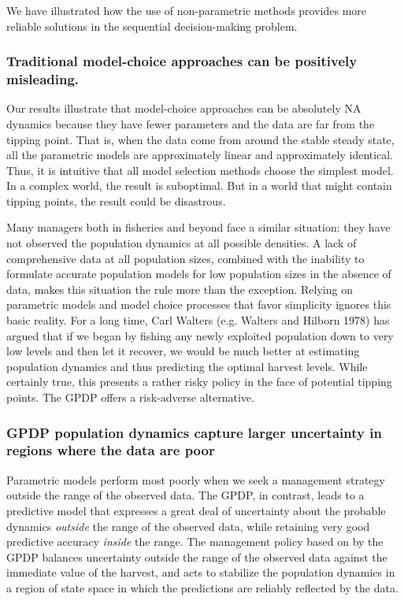 \documentclass[author-year, 12pt,review]{components/elsarticle} %
\begin{document}
We have illustrated how the use of non-parametric methods provides more
reliable solutions in the sequential decision-making problem.

\subsubsection{Traditional model-choice approaches can be positively
misleading.}\label{traditional-model-choice-approaches-can-be-positively-misleading.}

Our results illustrate that model-choice approaches can be absolutely NA
dynamics because they have fewer parameters and the data are far from
the tipping point. That is, when the data come from around the stable
steady state, all the parametric models are approximately linear and
approximately identical. Thus, it is intuitive that all model selection
methods choose the simplest model. In a complex world, the result is
suboptimal. But in a world that might contain tipping points, the result
could be disastrous.

Many managers both in fisheries and beyond face a similar situation:
they have not observed the population dynamics at all possible
densities. A lack of comprehensive data at all population sizes,
combined with the inability to formulate accurate population models for
low population sizes in the absence of data, makes this situation the
rule more than the exception. Relying on parametric models and model
choice processes that favor simplicity ignores this basic reality. For a
long time, Carl Walters (e.g. Walters and Hilborn 1978) has argued that
if we began by fishing any newly exploited population down to very low
levels and then let it recover, we would be much better at estimating
population dynamics and thus predicting the optimal harvest levels.
While certainly true, this presents a rather risky policy in the face of
potential tipping points. The GPDP offers a risk-adverse alternative.

\subsubsection{GPDP population dynamics capture larger uncertainty in
regions where the data are
poor}\label{gpdp-population-dynamics-capture-larger-uncertainty-in-regions-where-the-data-are-poor}

Parametric models perform most poorly when we seek a management strategy
outside the range of the observed data. The GPDP, in contrast, leads to
a predictive model that expresses a great deal of uncertainty about the
probable dynamics \emph{outside} the range of the observed data, while
retaining very good predictive accuracy \emph{inside} the range. The
management policy based on by the GPDP balances uncertainty outside the
range of the observed data against the immediate value of the harvest,
and acts to stabilize the population dynamics in a region of state space
in which the predictions are reliably reflected by the data.
\end{document}
